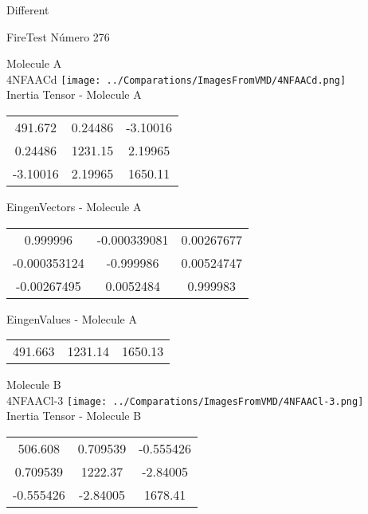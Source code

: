 \begin{center}
\vtab
\vtab
\textcolor{NavyBlue}{\Large Different}
\end{center}

 \newpage

\vtab[-2cm]
\begin{center}
{\large FireTest \tab Número 276}
\end{center}
\begin{multicols}{2}
\begin{center}

Molecule A \\ 
4NFAACd
\texttt{[image: ../Comparations/ImagesFromVMD/4NFAACd.png]}
\\
Inertia Tensor - Molecule A \\
\vtab

\begin{tabular}{|c c c|}
491.672	 & 	0.24486	 & 	-3.10016	 \\
0.24486	 & 	1231.15	 & 	2.19965	 \\
-3.10016	 & 	2.19965	 & 	1650.11
\end{tabular}

\vtab
 EingenVectors - Molecule A     \\
\vtab
\begin{tabular}{|c c c|}
0.999996	 & 	-0.000339081	 & 	0.00267677	 \\
-0.000353124	 & 	-0.999986	 & 	0.00524747	 \\
-0.00267495	 & 	0.0052484	 & 	0.999983
\end{tabular}

\vtab
 EingenValues - Molecule A     \\
\vtab
\begin{tabular}{|c c c|}
491.663	 & 	1231.14	 & 	1650.13	 \\
\end{tabular}
\columnbreak

Molecule B \\ 
4NFAACl-3
\texttt{[image: ../Comparations/ImagesFromVMD/4NFAACl-3.png]}
\\
Inertia Tensor - Molecule B \\
\vtab

\begin{tabular}{|c c c|}
506.608	 & 	0.709539	 & 	-0.555426	 \\
0.709539	 & 	1222.37	 & 	-2.84005	 \\
-0.555426	 & 	-2.84005	 & 	1678.41
\end{tabular}


\end{center}
\end{multicols}
